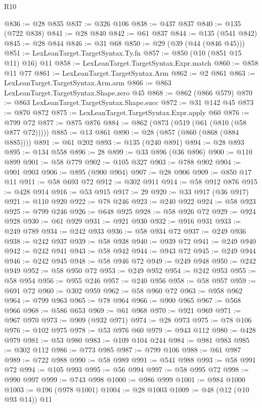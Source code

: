 \begin{lexlean}{R10}
\begin{coremodule}
@836 := @28 @835
@837 := @326 @106
@838 := @437 @837
@840 := @135 (@722 @838)
@841 := @28 @840
@842 := @61 @837
@844 := @135 (@541 @842)
@845 := @28 @844
@846 := @31 @68
@850 := @29 (@39 (@44 (@846 @45)))
@851 := LexLeanTarget.TargetSyntax.Ty.fn
@857 := @850 (@10 (@851 @15 @11) @16) @11
@858 := LexLeanTarget.TargetSyntax.Expr.match
@860 := @858 @11 @77
@861 := LexLeanTarget.TargetSyntax.Arm
@862 := @2 @861
@863 := LexLeanTarget.TargetSyntax.Arm.arm
@866 := @863 LexLeanTarget.TargetSyntax.Shape.zero @45
@868 := @862 (@866 @579)
@870 := @863 LexLeanTarget.TargetSyntax.Shape.succ
@872 := @31 @142 @45
@873 := @870 @872
@875 := LexLeanTarget.TargetSyntax.Expr.apply @60
@876 := @799 @72
@877 := @875 @876
@884 := @862 (@873 (@519 (@61 (@810 (@58 @877 @72)))))
@885 := @13 @861
@890 := @28 (@857 (@860 (@868 (@884 @885))))
@891 := @61 @202
@893 := @135 (@240 @891)
@894 := @28 @893
@895 := @134 @558
@896 := 28
@899 := @33 @896 (@36 @896)
@900 := @110 @899
@901 := @58 @779
@902 := @105 @327
@903 := @788 @902
@904 := @901 @903
@906 := @895 (@900 @904)
@907 := @28 @906
@909 := @850 @17 @11
@911 := @58 @693 @72
@912 := @302 @911
@914 := @58 @912 @876
@915 := @428 @914
@916 := @53 @915
@917 := 29
@920 := @33 @917 (@36 @917)
@921 := @110 @920
@922 := @78 @246
@923 := @240 @922
@924 := @58 @923
@925 := @799 @246
@926 := @648 @925
@928 := @58 @926 @72
@929 := @924 @928
@930 := @61 @929
@931 := @921 @930
@932 := @916 @931
@933 := @249 @789
@934 := @242 @933
@936 := @58 @934 @72
@937 := @249 @936
@938 := @242 @937
@939 := @58 @938
@940 := @939 @72
@941 := @249 @940
@942 := @242 @941
@943 := @58 @942
@944 := @943 @72
@945 := @249 @944
@946 := @242 @945
@948 := @58 @946 @72
@949 := @249 @948
@950 := @242 @949
@952 := @58 @950 @72
@953 := @249 @952
@954 := @242 @953
@955 := @58 @954
@956 := @955 @246
@957 := @240 @956
@958 := @58 @957
@959 := @691 @72
@960 := @302 @959
@962 := @58 @960 @72
@963 := @958 @962
@964 := @799 @963
@965 := @78 @964
@966 := @900 @965
@967 := @568 @966
@968 := @586 @653
@969 := @61 @968
@970 := @921 @969
@971 := @967 @970
@973 := @909 (@932 @971)
@974 := @28 @973
@975 := @78 @106
@976 := @102 @975
@978 := @53 @976 @60
@979 := @943 @112
@980 := @428 @979
@981 := @53 @980
@983 := @109 @104 @244
@984 := @981 @983
@985 := @302 @112
@986 := @773 @985
@987 := @799 @106
@988 := @61 @987
@989 := @722 @988
@990 := @58 @989
@991 := @541 @988
@993 := @58 @991 @72
@994 := @105 @993
@995 := @56 @994
@997 := @58 @995 @72
@998 := @990 @997
@999 := @743 @998
@1000 := @986 @999
@1001 := @984 @1000
@1003 := @196 (@978 @1001)
@1004 := @28 @1003
@1009 := @48 (@12 (@10 @93 @14)) @11

\end{coremodule}
\end{lexlean}
